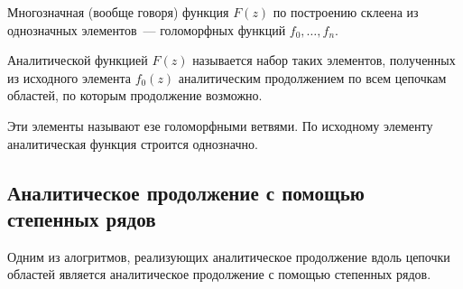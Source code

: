 \documentclass[a4paper, 12pt]{article}
\begin{document}
Многозначная (вообще говоря) функция $F(z)$ по построению склеена из однозначных элементов~--- голоморфных функций $f_0, \dotsc, f_n$.

Аналитической функцией $F(z)$ называется набор таких элементов, полученных из исходного элемента $f_0(z)$ аналитическим продолжением по всем цепочкам областей, по которым продолжение возможно.

Эти элементы называют езе голоморфными ветвями. По исходному элементу аналитическая функция строится однозначно.

\subsection{Аналитическое продолжение с помощью степенных рядов}
Одним из алогритмов, реализующих аналитическое продолжение вдоль цепочки областей является аналитическое продолжение с помощью степенных рядов.
\end{document}
